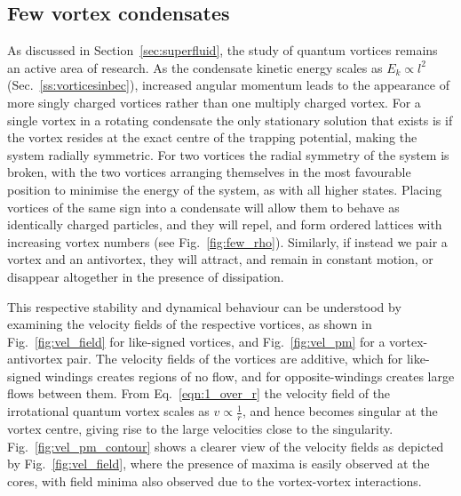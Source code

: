 \subsection{Few vortex condensates}\label{sec:fewvtx}

As discussed in Section~\ref{sec:superfluid}, the study of quantum vortices remains an active area of research. As the condensate kinetic energy scales as $E_k \propto l^2$ (Sec.~\ref{ss:vorticesinbec}), increased angular momentum leads to the appearance of more singly charged vortices rather than one multiply charged vortex. For a single vortex in a rotating condensate the only stationary solution that exists is if the vortex resides at the exact centre of the trapping potential, making the system radially symmetric. For two vortices the radial symmetry of the system is broken, with the two vortices arranging themselves in the most favourable position to minimise the energy of the system, as with all higher states. Placing vortices of the same sign into a condensate will allow them to behave as identically charged particles, and they will repel, and form ordered lattices with increasing vortex numbers (see Fig.~\ref{fig:few_rho}). Similarly, if instead we pair a vortex and an antivortex, they will attract, and remain in constant motion, or disappear altogether in the presence of dissipation.

This respective stability and dynamical behaviour can be understood by examining the velocity fields of the respective vortices, as shown in Fig.~\ref{fig:vel_field} for like-signed vortices, and Fig.~\ref{fig:vel_pm} for a vortex-antivortex pair. The velocity fields of the vortices are additive, which for like-signed windings creates regions of no flow, and for opposite-windings creates large flows between them. From Eq.~\ref{eqn:1_over_r} the velocity field of the irrotational quantum vortex scales as $v \propto \frac{1}{r}$, and hence becomes singular at the vortex centre, giving rise to the large velocities close to the singularity. Fig.~\ref{fig:vel_pm_contour} shows a clearer view of the velocity fields as depicted by Fig.~\ref{fig:vel_field}, where the presence of maxima is easily observed at the cores, with field minima also observed due to the vortex-vortex interactions.

